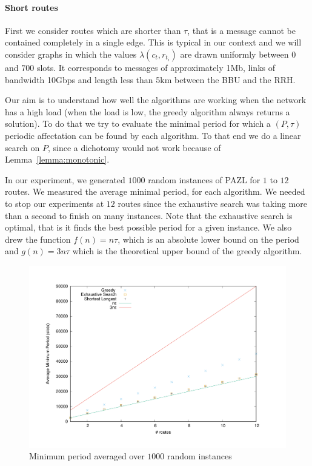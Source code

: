 \documentclass[a4paper,10pt]{article}
\begin{document}
      \paragraph{Short routes}
      
      First we consider routes which are shorter than $\tau$, that is a message cannot be contained 
      completely in a single edge. This is typical in our context and we will consider graphs in which the values $\lambda(c_t,r_{t_i})$ are drawn uniformly between $0$ and $700$ slots. It corresponds to messages of approximately 1Mb, links of bandwidth 10Gbps and length less than 5km between the BBU and the RRH. 
      

      
      Our aim is to understand how well the algorithms are working when the network has a high load (when 
      the load is low, the greedy algorithm always returns a solution). To do that we try to evaluate the 
      minimal period for which a $(P,\tau)$ periodic affectation can be found by each algorithm. 
      To that end we do a linear search on $P$, since a dichotomy would not work because of Lemma~\ref{lemma:monotonic}.
      
      
      In our experiment, we generated $1000$ random instances of PAZL for $1$ to $12$ routes. 
      We measured the average minimal period, for each algorithm. We needed to stop our experiments at $12$ routes since the exhaustive search was taking more than a second to finish on many instances.
      Note that the exhaustive search is optimal, that is it finds the best possible period for a given instance. 
      We also drew the function $f(n) = n\tau$, which is an absolute lower bound on the period and $g(n) = 3n\tau$ which is the theoretical upper bound of the greedy algorithm.
      
      
        
      \begin{figure}

      \begin{center}
	\includegraphics[scale=0.4]{periode_petite.pdf}
      \end{center}
      \caption{Minimum period averaged over $1000$ random instances}
      \end{figure}
      
\end{document}
